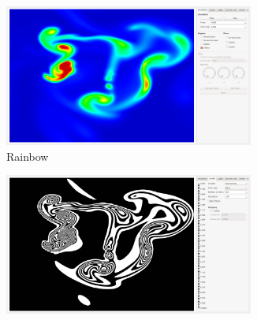\begin{figure}[htb]
	\centering
	\begin{subfigure}{0.35\textwidth}
		\centering
		\includegraphics[width=0.9\textwidth, trim={35px 30px 430px 30px}, clip]{colormapping/img/rainbow}
		\caption{Rainbow}
		\label{fig:colormapping:intro:differntColorMaps:rainbow}
	\end{subfigure}
	\hspace{30px}
	\begin{subfigure}{0.35\textwidth}
		\centering
		\includegraphics[width=0.9\textwidth, trim={35px 30px 430px 30px}, clip]{colormapping/img/zebra_166}
		\begin{tikzpicture}

\end{tikzpicture}
\end{subfigure}
\end{figure}
